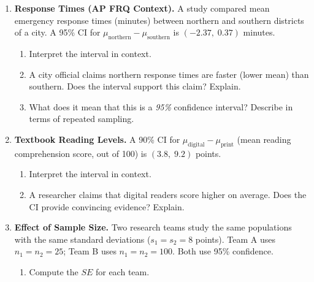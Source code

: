 \documentclass[10pt]{article}
\begin{document}
\namedateperiod

\vspace{0.15in}

\begin{enumerate}

\item \textbf{Response Times (AP FRQ Context).} \quad
A study compared mean emergency response times (minutes) between northern and southern
districts of a city. A 95\% CI for $\mu_{\text{northern}} - \mu_{\text{southern}}$ is
$(-2.37,\; 0.37)$ minutes.

\begin{enumerate}[label=\alph*.]
  \item Interpret the interval in context. 
  \item A city official claims northern response times are faster (lower mean) than
        southern. Does the interval support this claim? Explain. 
  \item What does it mean that this is a \emph{95\%} confidence interval? Describe in
        terms of repeated sampling. \writeline
\end{enumerate}

\vspace{0.06in}

\item \textbf{Textbook Reading Levels.} \quad
A 90\% CI for $\mu_{\text{digital}} - \mu_{\text{print}}$ (mean reading comprehension score,
out of 100) is $(3.8,\; 9.2)$ points.

\begin{enumerate}[label=\alph*.]
  \item Interpret the interval in context. 
  \item A researcher claims that digital readers score higher on average. Does the CI
        provide convincing evidence? Explain. 
\end{enumerate}

\vspace{0.06in}

\item \textbf{Effect of Sample Size.} \quad
Two research teams study the same populations with the same standard deviations
($s_1 = s_2 = 8$ points). Team A uses $n_1 = n_2 = 25$; Team B uses $n_1 = n_2 = 100$.
Both use 95\% confidence.

\begin{enumerate}[label=\alph*.]
  \item Compute the $SE$ for each team.


\end{enumerate}
\end{enumerate}
\end{document}
